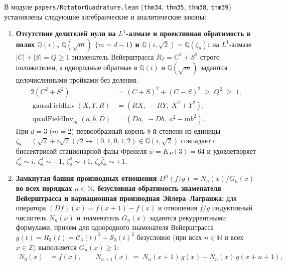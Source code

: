 \begin{theorem}[Однородная проективная арифметика в $\mathbb{Q}(i)$, $\mathbb{Q}(\sqrt{d-1})$ и $\mathbb{Q}(i,\sqrt{2}) = \mathbb{Q}(\zeta_8)$, башня разностных производных всех порядков и многомерная кубатура Симпсона на $O_2(d)$]
\label{thm:mono-projective-fields-c-infinity-simpson}
В модуле \texttt{papers/RotatorQuadrature.lean} (\texttt{thm34}, \texttt{thm35}, \texttt{thm38}, \texttt{thm39}) установлены следующие алгебраические и аналитические законы:
\begin{enumerate}[label=\textbf{(\arabic*)},leftmargin=*]
\item \textbf{Отсутствие делителей нуля на $L^1$-алмазе и проективная обратимость в полях $\mathbb{Q}(i)$, $\mathbb{Q}(\sqrt{m})$ ($m = d - 1$) и $\mathbb{Q}(i,\sqrt{2}) = \mathbb{Q}(\zeta_8)$:}
  на $L^1$-алмазе $|C| + |S| = Q \ge 1$ знаменатель Вейерштрасса $R_T = C^2 + S^2$ строго положителен, а однородные обратные в $\mathbb{Q}(i)$ и $\mathbb{Q}(\sqrt{m})$ задаются целочисленными тройками без деления:
  \begin{align}
    2(C^2 + S^2) &= (C + S)^2 + (C - S)^2 \;\ge\; Q^2 \;\ge\; 1, \label{eq:mono-diamond-no-zero-div} \\
    \operatorname{gaussFieldInv}(X, Y, R) &= (R X,\; -R Y,\; X^2 + Y^2), \label{eq:mono-gauss-inv} \\
    \operatorname{quadFieldInv}_m(a, b, D) &= (D a,\; -D b,\; a^2 - m b^2). \label{eq:mono-quad-inv}
  \end{align}
  При $d = 3$ ($m = 2$) первообразный корень $8$-й степени из единицы $\zeta_8 = (\sqrt{2} + i\sqrt{2})/2 \leftrightarrow (0, 1, 0, 1, 2) \in \mathbb{Q}(i, \sqrt{2})$ совпадает с биссектрисой стационарной фазы Френеля $\psi = K_P(3) = 64$ и удовлетворяет $\zeta_8^2 \sim i$, $\zeta_8^4 \sim -1$, $\zeta_8^8 \sim +1$, $\zeta_8\bar{\zeta}_8 \sim +1$.
\item \textbf{Замкнутая башня производных отношения $D^n(f/g) = N_n(x)/G_n(x)$ во всех порядках $n \in \mathbb{N}$, безусловная обратимость знаменателя Вейерштрасса и вариационная производная Эйлера--Лагранжа:}
  для оператора $(Df)(x) = f(x+1) - f(x)$ и отношения $f / g$ индуктивный числитель $N_n(x)$ и знаменатель $G_n(x)$ задаются рекуррентными формулами, причём для однородного знаменателя Вейерштрасса $g(t) = R_3(t) = \mathcal{C}_3(t)^2 + \mathcal{S}_3(t)^2$ безусловно (при всех $n \in \mathbb{N}$ и всех $x \in \mathbb{Z}$) выполняется $G_n(x) \ge 1$:
  \begin{align}
    N_0(x) &= f(x), \qquad
    N_{n+1}(x) \;=\; N_n(x+1)\,g(x) - N_n(x)\,g(x+n+1), \label{eq:mono-quotient-numer-rec} \\

\end{align}
\end{enumerate}
\end{theorem}
